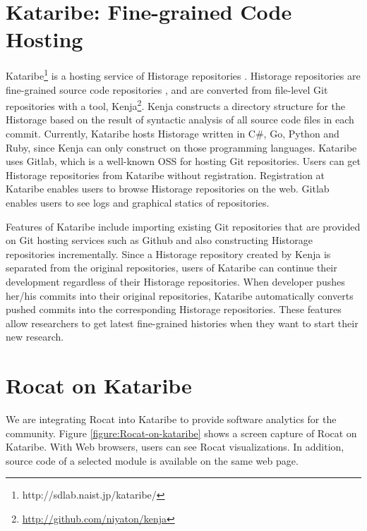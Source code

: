 \documentclass[conference]{IEEEtran}
\newcommand{\figref}[1]{Figure \ref{#1}}
\begin{document}
\section{Kataribe: Fine-grained Code Hosting}
\textsf{Kataribe}\footnote{http://sdlab.naist.jp/kataribe/} is a hosting service of \textsf{Historage} repositories \cite{Fujiwara:2014:KHS:2597073.2597125}.
\textsf{Historage} repositories are fine-grained source code repositories \cite{Hata:2011:HFV:2024445.2024463}, and are converted from file-level Git repositories with a tool, \textsf{Kenja}\footnote{\url{http://github.com/niyaton/kenja}}.
\textsf{Kenja} constructs a directory structure for the \textsf{Historage} based on the result of syntactic analysis of all source code files in each commit.
Currently, \textsf{Kataribe} hosts \textsf{Historage} written in C\#, Go, Python and Ruby, since \textsf{Kenja} can only construct on those programming languages.
\textsf{Kataribe} uses \textsf{Gitlab}, which is a well-known OSS for hosting Git repositories.
Users can get \textsf{Historage} repositories from \textsf{Kataribe} without registration.
Registration at \textsf{Kataribe} enables users to browse \textsf{Historage} repositories on the web.
\textsf{Gitlab} enables users to see logs and graphical statics of repositories.

Features of \textsf{Kataribe} include importing existing Git repositories that are provided on Git hosting services such as \textsf{Github} and also constructing \textsf{Historage} repositories incrementally.
Since a \textsf{Historage} repository created by \textsf{Kenja} is separated from the original repositories, users of \textsf{Kataribe} can continue their development regardless of their \textsf{Historage} repositories.
When developer pushes her/his commits into their original repositories, \textsf{Kataribe} automatically converts pushed commits into the corresponding \textsf{Historage} repositories.
These features allow researchers to get latest fine-grained histories when they want to start their new research.

\section{Rocat on Kataribe}
We are integrating \textsf{Rocat} into \textsf{Kataribe} to provide software analytics for the community.
\figref{figure:Rocat-on-kataribe} shows a screen capture of \textsf{Rocat} on \textsf{Kataribe}.
With Web browsers, users can see \textsf{Rocat} visualizations. In addition, source code of a selected module is available on the same web page.
\end{document}
